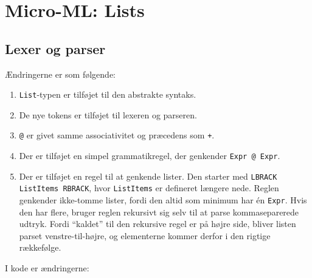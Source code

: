 \section{Micro-ML: Lists}

\subsection{Lexer og parser}

Ændringerne er som følgende:

\begin{enumerate}
    \item \texttt{List}-typen er tilføjet til den abstrakte syntaks.
    \item De nye tokens er tilføjet til lexeren og parseren.
    \item \texttt{@} er givet samme associativitet og præcedens som \texttt{+}.
    \item Der er tilføjet en simpel grammatikregel, der genkender \texttt{Expr @ Expr}.
    \item Der er tilføjet en regel til at genkende lister. Den starter med \texttt{LBRACK ListItems RBRACK}, hvor \texttt{ListItems} er defineret længere nede. Reglen genkender ikke-tomme lister, fordi den altid som minimum har én \texttt{Expr}. Hvis den har flere, bruger reglen rekursivt sig selv til at parse kommaseparerede udtryk. Fordi ``kaldet'' til den rekursive regel er på højre side, bliver listen parset venstre-til-højre, og elementerne kommer derfor i den rigtige rækkefølge.
\end{enumerate}

I kode er ændringerne:

